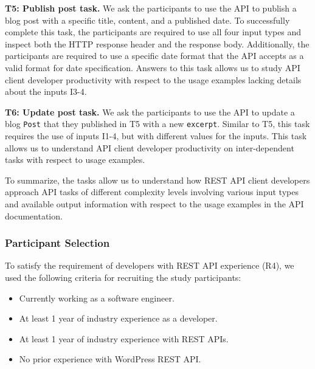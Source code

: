 \documentclass[conference]{IEEEtran}
\begin{document}
\textbf{T5: Publish post task.} We ask the participants to use the API to publish a blog post with a specific title, content, and a published date. To successfully complete this task, the participants are required to use all four input types and inspect both the HTTP response header and the response body. Additionally, the participants are required to use a specific date format that the API accepts as a valid format for date specification. Answers to this task allows us to study API client developer productivity with respect to the usage examples lacking details about the inputs I3-4.

\textbf{T6: Update post task.} We ask the participants to use the API to update a blog \lstinline{Post} that they published in T5 with a new \lstinline{excerpt}. Similar to T5, this task requires the use of inputs I1-4, but with different values for the inputs. This task allows us to understand API client developer productivity on inter-dependent tasks with respect to usage examples.

To summarize, the tasks allow us to understand how REST API client developers approach API tasks of different complexity levels involving various input types and available output information with respect to the usage examples in the API documentation.

\subsubsection{Participant Selection} %

To satisfy the requirement of developers with REST API experience (R4), we used the following criteria for recruiting the study participants:

\begin{itemize}
  \item Currently working as a software engineer.
  \item At least 1 year of industry experience as a developer.
  \item At least 1 year of industry experience with REST APIs.
  \item No prior experience with WordPress REST API.
\end{itemize}
\end{document}
